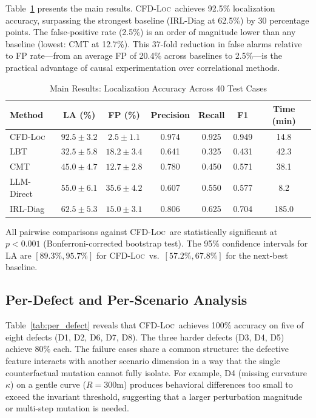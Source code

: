 \documentclass[journal]{IEEEtran}
\theoremstyle{plain}
\newcommand{\methodname}{\textsc{CFD-Loc}}
\begin{document}
Table~\ref{tab:main} presents the main results. \methodname\ achieves 92.5\% localization accuracy, surpassing the strongest baseline (IRL-Diag at 62.5\%) by 30 percentage points. The false-positive rate (2.5\%) is an order of magnitude lower than any baseline (lowest: CMT at 12.7\%). This 37-fold reduction in false alarms relative to FP rate---from an average FP of 20.4\% across baselines to 2.5\%---is the practical advantage of causal experimentation over correlational methods.

\begin{table}[t]
\centering\small
\caption{Main Results: Localization Accuracy Across 40 Test Cases}
\label{tab:main}
\begin{tabular}{lcccccc}
\toprule
\textbf{Method} & \textbf{LA (\%)} & \textbf{FP (\%)} & \textbf{Precision} & \textbf{Recall} & \textbf{F1} & \textbf{Time (min)} \\\midrule
\rowcolor{accentgreen!12}
\methodname & $\mathbf{92.5 \pm 3.2}$ & $\mathbf{2.5 \pm 1.1}$ & 0.974 & 0.925 & 0.949 & 14.8 \\
LBT & $32.5 \pm 5.8$ & $18.2 \pm 3.4$ & 0.641 & 0.325 & 0.431 & 42.3 \\
CMT & $45.0 \pm 4.7$ & $12.7 \pm 2.8$ & 0.780 & 0.450 & 0.571 & 38.1 \\
LLM-Direct & $55.0 \pm 6.1$ & $35.6 \pm 4.2$ & 0.607 & 0.550 & 0.577 & 8.2 \\
IRL-Diag & $62.5 \pm 5.3$ & $15.0 \pm 3.1$ & 0.806 & 0.625 & 0.704 & 185.0 \\
\bottomrule
\end{tabular}
\end{table}

All pairwise comparisons against \methodname\ are statistically significant at $p<0.001$ (Bonferroni-corrected bootstrap test). The 95\% confidence intervals for LA are $[89.3\%, 95.7\%]$ for \methodname\ vs.\ $[57.2\%, 67.8\%]$ for the next-best baseline.

\subsection{Per-Defect and Per-Scenario Analysis}

Table~\ref{tab:per_defect} reveals that \methodname\ achieves 100\% accuracy on five of eight defects (D1, D2, D6, D7, D8). The three harder defects (D3, D4, D5) achieve 80\% each. The failure cases share a common structure: the defective feature interacts with another scenario dimension in a way that the single counterfactual mutation cannot fully isolate. For example, D4 (missing curvature $\kappa$) on a gentle curve ($R=300$m) produces behavioral differences too small to exceed the invariant threshold, suggesting that a larger perturbation magnitude or multi-step mutation is needed.
\end{document}
